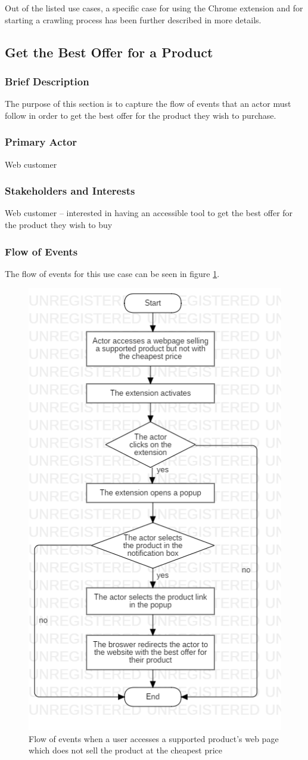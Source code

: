 \documentclass[12pt,a4paper,twoside]{report}
\begin{document}
Out of the listed use cases, a specific case for using the Chrome extension and for starting a crawling process has been further described in more details.


\subsection{Get the Best Offer for a Product} \label{subsec:use_case_not_cheapest}

\subsubsection{Brief Description}

The purpose of this section is to capture the flow of events that an actor must follow in order to get the best offer for the product they wish to purchase.


\subsubsection{Primary Actor}

Web customer


\subsubsection{Stakeholders and Interests}

Web customer – interested in having an accessible tool to get the best offer for the product they wish to buy


\subsubsection{Flow of Events}

The flow of events for this use case can be seen in figure \ref{fig:flow_not_cheapest_offer}.

\begin{figure}[ht]
  \centering
  \includegraphics[width=0.4\linewidth]{img/flow_not_cheapest_offer.png}
  \caption{Flow of events when a user accesses a supported product's web page which does not sell the product at the cheapest price}
  \label{fig:flow_not_cheapest_offer}
\end{figure}
\end{document}
